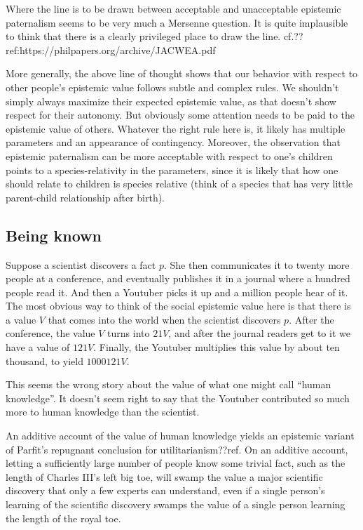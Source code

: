 Where the line is to be drawn between acceptable and unacceptable epistemic paternalism seems to be very
much a Mersenne question. It is quite implausible to think that there is a clearly privileged place to draw
the line. cf.??ref:https://philpapers.org/archive/JACWEA.pdf

More generally, the above line of thought shows that our behavior with respect to other people's epistemic
value follows subtle and complex rules. We shouldn't simply always maximize their expected epistemic value, as that
doesn't show respect for their autonomy. But obviously some attention needs to be paid to the epistemic value of
others.
Whatever the right rule here is, it likely has multiple parameters and an appearance of contingency. 
Moreover, the observation that epistemic paternalism can be more acceptable with respect to one's children points
to a species-relativity in the parameters, since it is likely that how one should relate to children is species
relative (think of a species that has very little parent-child relationship after birth).

\subsection{Being known}
Suppose a scientist discovers a fact $p$. She then communicates it to twenty more people at a conference,
and eventually publishes it in a journal where a hundred people read it. And then a Youtuber picks it up and
a million people hear of it. The most obvious way to think of the social epistemic value here is that there
is a value $V$ that comes into the world when the scientist discovers $p$. After the conference, the value
$V$ turns into $21V$, and after the journal readers get to it we have a value of $121V$. Finally, the Youtuber
multiplies this value by about ten thousand, to yield $1000121V$. 

This seems the wrong story about the value of what one might call ``human knowledge''. It doesn't seem
right to say that the Youtuber contributed so much more to human knowledge than the scientist. 

An additive account of the value of human knowledge yields an epistemic variant of Parfit's repugnant conclusion
for utilitarianism??ref. On an additive account, letting a sufficiently large number of people know some trivial
fact, such as the length of Charles III's left big toe, will swamp the value a major scientific discovery that only a few experts can understand, even if a single person's learning of the scientific discovery swamps the value of a single
person learning the length of the royal toe.

